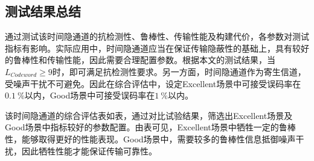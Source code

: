 \subsection{测试结果总结}
\label{chap:hash:result:evaluation}

通过测试该时间隐通道的抗检测性、鲁棒性、传输性能及构建代价，各参数对测试指标有影响。实际应用中，时间隐通道应当在保证传输隐蔽性的基础上，具有较好的鲁棒性和传输性能，因此需要合理配置参数。根据本文的测试结果，当$L_{Codeword}\ge 9$时，即可满足抗检测性要求。另一方面，时间隐通道作为寄生信道，受噪声干扰不可避免。因此在综合评估中，设定Excellent场景中可接受误码率在{$0.1\ \%$}以内，Good场景中可接受误码率在{$1\ \%$}以内。


该时间隐通道的综合评估表如表，通过对比试验结果，筛选出Excellent场景及Good场景中指标较好的参数配置。由表可见，Excellent场景中牺牲一定的鲁棒性，能够取得更好的性能表现。Good场景中，需要较多的鲁棒性信息抵御噪声干扰，因此牺牲性能才能保证传输可靠性。


